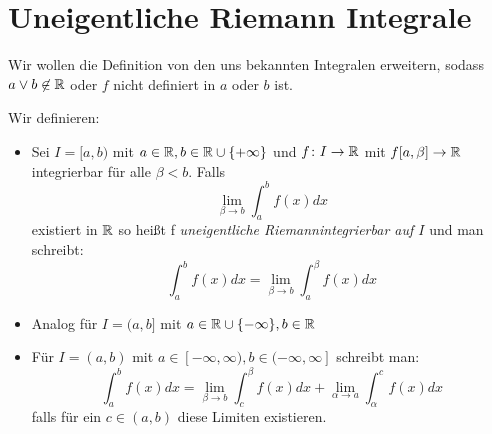 \section{Uneigentliche Riemann Integrale}
Wir wollen die Definition von den uns bekannten Integralen erweitern, sodass $a \vee b \not\in \mathbb{R}$ oder $f$ nicht definiert in $a$ oder $b$ ist.
\begin{definition}
	Wir definieren:
	\begin{itemize}
		\item 
	Sei $I = [a,b)$ mit $a \in \mathbb{R}, b \in \mathbb{R} \cup \{+\infty\}$ und $f \colon I \to \mathbb{R} $ mit $f[a,\beta] \to \mathbb{R}$ integrierbar für alle $\beta < b$. Falls 
	\[
	\lim_{\beta \to b} \int_a^b f(x) dx
	\]
	existiert in $\mathbb{R}$ so heißt f \emph{uneigentliche Riemannintegrierbar auf $I$ } und man schreibt:
	\[
		\int_a^b f(x) dx = \lim_{\beta \to b} \int_a^{\beta} f(x) dx
	\]
\item Analog für $I = (a,b]$ mit $a \in \mathbb{R} \cup \{-\infty\} , b \in \mathbb{R}$
\item Für $I = (a,b)$ mit $a \in [-\infty,\infty), b \in (-\infty,\infty]$ schreibt man:
	\[
		\int_a^b f(x) dx = \lim_{\beta \to b} \int_c^{\beta} f(x) dx + \lim_{\alpha \to a} \int_{\alpha}^c f(x) dx
	\]
	falls für ein $c \in (a,b)$ diese Limiten existieren.
\end{itemize}
\end{definition}
